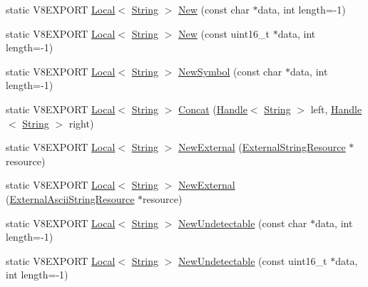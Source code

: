 \begin{DoxyCompactItemize}
\item 
static V8\+E\+X\+P\+O\+R\+T \hyperlink{classv8_1_1_local}{Local}$<$ \hyperlink{classv8_1_1_string}{String} $>$ \hyperlink{classv8_1_1_string_af0f9c44d85056bd575c01e8be7cc1b01}{New} (const char $\ast$data, int length=-\/1)
\item 
static V8\+E\+X\+P\+O\+R\+T \hyperlink{classv8_1_1_local}{Local}$<$ \hyperlink{classv8_1_1_string}{String} $>$ \hyperlink{classv8_1_1_string_a0a2f209db9234477210b8dbf50d50048}{New} (const uint16\+\_\+t $\ast$data, int length=-\/1)
\item 
static V8\+E\+X\+P\+O\+R\+T \hyperlink{classv8_1_1_local}{Local}$<$ \hyperlink{classv8_1_1_string}{String} $>$ \hyperlink{classv8_1_1_string_a496a7a6bb043ae49da105e2648e26c20}{New\+Symbol} (const char $\ast$data, int length=-\/1)
\item 
static V8\+E\+X\+P\+O\+R\+T \hyperlink{classv8_1_1_local}{Local}$<$ \hyperlink{classv8_1_1_string}{String} $>$ \hyperlink{classv8_1_1_string_af21c9d008c6dfc72277b9183d0839940}{Concat} (\hyperlink{classv8_1_1_handle}{Handle}$<$ \hyperlink{classv8_1_1_string}{String} $>$ left, \hyperlink{classv8_1_1_handle}{Handle}$<$ \hyperlink{classv8_1_1_string}{String} $>$ right)
\item 
static V8\+E\+X\+P\+O\+R\+T \hyperlink{classv8_1_1_local}{Local}$<$ \hyperlink{classv8_1_1_string}{String} $>$ \hyperlink{classv8_1_1_string_a4de1bc36a0c6fe52d12726b85d0853f1}{New\+External} (\hyperlink{classv8_1_1_string_1_1_external_string_resource}{External\+String\+Resource} $\ast$resource)
\item 
static V8\+E\+X\+P\+O\+R\+T \hyperlink{classv8_1_1_local}{Local}$<$ \hyperlink{classv8_1_1_string}{String} $>$ \hyperlink{classv8_1_1_string_a07c47bf675b802c550984fa24511a589}{New\+External} (\hyperlink{classv8_1_1_string_1_1_external_ascii_string_resource}{External\+Ascii\+String\+Resource} $\ast$resource)
\item 
static V8\+E\+X\+P\+O\+R\+T \hyperlink{classv8_1_1_local}{Local}$<$ \hyperlink{classv8_1_1_string}{String} $>$ \hyperlink{classv8_1_1_string_a49b2b16c53998e22f3ad9d06fb49a3fd}{New\+Undetectable} (const char $\ast$data, int length=-\/1)
\item 
static V8\+E\+X\+P\+O\+R\+T \hyperlink{classv8_1_1_local}{Local}$<$ \hyperlink{classv8_1_1_string}{String} $>$ \hyperlink{classv8_1_1_string_a7b39f3e76d0d62a5ca8dafc976599c57}{New\+Undetectable} (const uint16\+\_\+t $\ast$data, int length=-\/1)
\end{DoxyCompactItemize}


